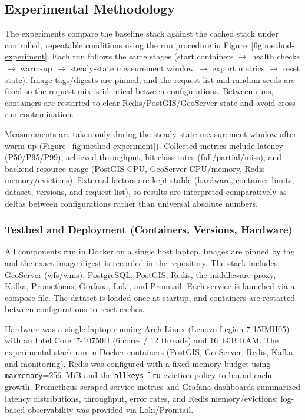 \subsection{Experimental Methodology}
The experiments compare the baseline stack against the cached stack under controlled, repeatable conditions using the run procedure in Figure~\ref{fig:method-experiment}. Each run follows the same stages (start containers $\rightarrow$ health checks $\rightarrow$ warm-up $\rightarrow$ steady-state measurement window $\rightarrow$ export metrics $\rightarrow$ reset state). Image tags/digests are pinned, and the request list and random seeds are fixed so the request mix is identical between configurations. Between runs, containers are restarted to clear Redis/PostGIS/GeoServer state and avoid cross-run contamination.

Measurements are taken only during the steady-state measurement window after warm-up (Figure~\ref{fig:method-experiment}). Collected metrics include latency (P50/P95/P99), achieved throughput, hit class rates (full/partial/miss), and backend resource usage (PostGIS CPU, GeoServer CPU/memory, Redis memory/evictions). External factors are kept stable (hardware, container limits, dataset, versions, and request list), so results are interpreted comparatively as deltas between configurations rather than universal absolute numbers.

\subsubsection{Testbed and Deployment (Containers, Versions, Hardware)}
\label{sec:method-testbed}
All components run in Docker on a single host laptop. Images are pinned by tag and the exact image digest is recorded in the repository. The stack includes: GeoServer (\ac{wfs}/\ac{wms}), PostgreSQL, PostGIS, Redis, the middleware proxy, Kafka, Prometheus, Grafana, Loki, and Promtail. Each service is launched via a compose file. The dataset is loaded once at startup, and containers are restarted between configurations to reset caches.

Hardware was a single laptop running Arch Linux (Lenovo Legion 7 15IMH05) with an Intel Core i7-10750H (6 cores / 12 threads) and 16~GiB RAM. The experimental stack ran in Docker containers (PostGIS, GeoServer, Redis, Kafka, and monitoring). Redis was configured with a fixed memory budget using \texttt{maxmemory}=256~MiB and the \texttt{allkeys-lru} eviction policy to bound cache growth. Prometheus scraped service metrics and Grafana dashboards summarized latency distributions, throughput, error rates, and Redis memory/evictions; log-based observability was provided via Loki/Promtail.


